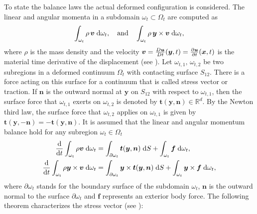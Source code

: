 To state the balance laws the actual deformed configuration is considered. The linear and angular momenta in a subdomain $\omega_t \subset \Omega_t$ are computed as 
\begin{equation*}
\int_{\omega_t} \rho \, \bm{v} \d{\omega_t}, \quad\text{and}\quad \int_{\omega_t} \rho \, \bm{y} \times \bm{v} \d{\omega_t},
\end{equation*}
where $\rho$ is the mass density and the velocity $\bm{v} = \frac{D\bm{u}}{Dt}(\bm{y},t) = \diffp{\bm{u}}{t}(\bm{x},t)$ is the material time derivative of the displacement (see \cite[Chapter 1]{abeyaratne2012notes}).  Let $\omega_{t, 1},\, \omega_{t, 2}$ be two subregions in a deformed continuum $\Omega_t$ with contacting surface $S_{12}$. There is a force acting on this surface for a continuum that is called stress vector or traction. If $\bm{n}$ is the outward normal at $\bm{y}$ on $S_{12}$ with respect to $\omega_{t, 1}$, then the surface force that $\omega_{t, 1}$ exerts on $\omega_{t, 2}$ is denoted by $\bm{t}(\bm{y}, \bm{n}) \in \mathbb{R}^d$. By the Newton third law, the surface force that $\omega_{t, 2}$ applies on $\omega_{t, 1}$ is given by $\bm{t}(\bm{y}, -\bm{n}) = - \bm{t}(\bm{y}, \bm{n})$. It is assumed that the linear and angular momentum balance hold for any subregion $\omega_t \in \Omega_t$ 
\begin{align*}
	\diff{}{t} \int_{\omega_t} \rho \bm{v} \d{\omega_t} &= \int_{\partial \omega_t} \bm{t}(\bm{y}, \bm{n}) \d{S} + \int_{\omega_t} \bm{f} \d{\omega_t}, \\
	\diff{}{t} \int_{\omega_t} \rho\bm{y} \times \bm{v} \d{\omega_t} &= \int_{\partial \omega_t} \bm{y} \times \bm{t}(\bm{y}, \bm{n}) \d{S} + \int_{\omega_t} \bm{y} \times \bm{f} \d{\omega_t}, \\
\end{align*}
where $\partial \omega_t$ stands for the boundary surface of the subdomain $\omega_t$, $\bm{n}$ is the outward normal to the surface $\partial\omega_t$ and $\bm{f}$ represents an exterior body force. The following theorem characterizes the stress vector (see \cite[Chapter 2]{ciarlet1988mathematical}):

